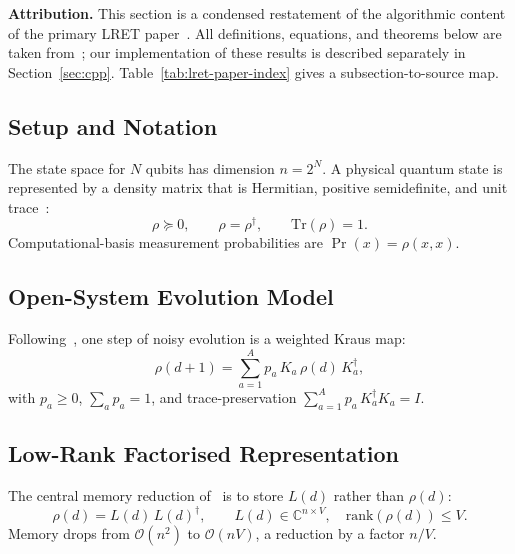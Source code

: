 \documentclass[11pt,a4paper]{article}
\begin{document}
\begin{infobox}
\textbf{Attribution.} This section is a condensed restatement of the algorithmic
content of the primary LRET paper~\cite{chen2021lret}. All definitions, equations, and
theorems below are taken from~\cite{chen2021lret}; our implementation of these
results is described separately in Section~\ref{sec:cpp}. Table~\ref{tab:lret-paper-index}
gives a subsection-to-source map.
\end{infobox}

\subsection{Setup and Notation}
\label{sec:math-setup}

The state space for $N$ qubits has dimension $n = 2^N$. A physical quantum state is
represented by a density matrix that is Hermitian, positive semidefinite, and unit trace~\cite{nielsenchuang2010,chen2021lret}:
\begin{equation}
  \rho \succeq 0,\qquad \rho = \rho^\dagger,\qquad \mathrm{Tr}(\rho) = 1.
\end{equation}
Computational-basis measurement probabilities are $\Pr(x) = \rho(x,x)$.

\subsection{Open-System Evolution Model}
\label{sec:math-open}

Following~\cite{chen2021lret}, one step of noisy evolution is a weighted
Kraus map:
\begin{equation}
  \rho(d+1) = \sum_{a=1}^{A} p_a \, K_a \, \rho(d) \, K_a^\dagger,
\end{equation}
with $p_a \geq 0$, $\sum_a p_a = 1$, and trace-preservation
$\sum_{a=1}^{A} p_a\,K_a^\dagger K_a = I$.

\subsection{Low-Rank Factorised Representation}
\label{sec:math-lr}

The central memory reduction of~\cite{chen2021lret} is to store $L(d)$ rather than
$\rho(d)$:
\begin{equation}
  \rho(d) = L(d)\,L(d)^\dagger,\qquad L(d) \in \mathbb{C}^{n \times V},\quad
  \mathrm{rank}(\rho(d)) \leq V.
\end{equation}
Memory drops from $\mathcal{O}(n^2)$ to $\mathcal{O}(nV)$, a reduction by a factor
$n/V$.
\end{document}

